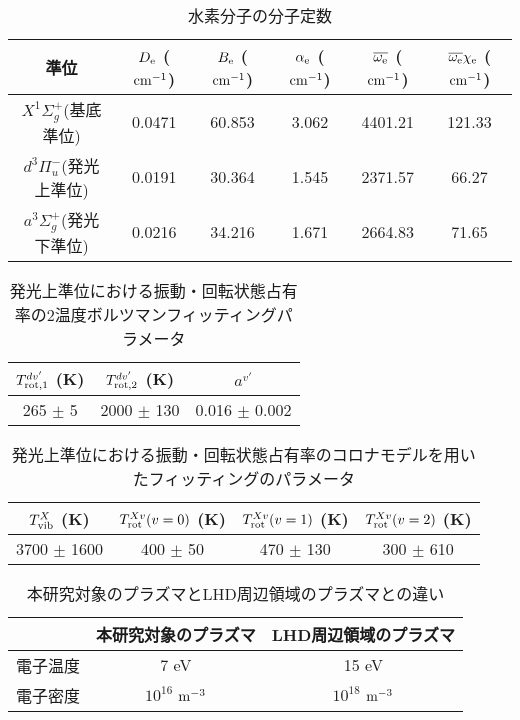 \listoftables
{}

\begin{table}
    \caption{水素分子の分子定数\cite{nist}}
    \label{table:molecular-constants}
    \centering
    \begin{tabular}{cccccc}
        \hline
        準位 & $D_{\rm e}$ ($\rm cm^{-1}$)& $B_{\rm e}$ ($\rm cm^{-1}$)& $\alpha_{\rm e}$ ($\rm cm^{-1}$)& $\overline{\omega_{\rm e}}$ ($\rm cm^{-1}$)& $\overline{\omega_{\rm e}} \chi_{\rm e}$ ($\rm cm^{-1}$)\\
        \hline
        $X^1 \Sigma^+_g$(基底準位) & 0.0471 & 60.853 & 3.062 & 4401.21 & 121.33\\
        $d^3 \Pi^-_u$(発光上準位) & 0.0191 & 30.364 & 1.545 & 2371.57 & 66.27\\
        $a^3 \Sigma^+_g$(発光下準位) & 0.0216 & 34.216 & 1.671 & 2664.83 & 71.65\\
        \hline
    \end{tabular}
\end{table}

\begin{table}
    \caption{発光上準位における振動・回転状態占有率の2温度ボルツマンフィッティングパラメータ}
    \label{table:two-boltzmann-parameters}
    \centering
    \begin{tabular}{ccc}
        \hline
        $T^{dv'}_{\rm rot,1}$ (K) & $T^{dv'}_{\rm rot,2}$ (K) & $a^{v'}$ \\
        \hline
        265 $\pm$ 5 & 2000 $\pm$ 130 & 0.016 $\pm$ 0.002\\
        \hline
    \end{tabular}
\end{table}

\begin{table}
    \caption{発光上準位における振動・回転状態占有率のコロナモデルを用いたフィッティングのパラメータ}
    \label{table:fitting-result}
    \centering
    \begin{tabular}{cccc}
        \hline
        $T^{X}_{\rm vib}$ (K) & $T^{Xv}_{\rm rot}(v=0)$ (K) & $T^{Xv}_{\rm rot}(v=1)$ (K) & $T^{Xv}_{\rm rot}(v=2)$ (K)\\
        \hline
        3700 $\pm$ 1600 & 400 $\pm$ 50 & 470 $\pm$ 130 & 300 $\pm$ 610\\
        \hline
    \end{tabular}
\end{table}

\begin{table}
    \caption{本研究対象のプラズマとLHD周辺領域のプラズマ\cite{ishihara}との違い}
    \label{table:LHD-and-this-plasma}
    \centering
    \begin{tabular}{ccc}
        \hline
         & 本研究対象のプラズマ & LHD周辺領域のプラズマ\\
        \hline
        電子温度 & 7 eV & 15 eV\\
        電子密度 & $10^{16}$ $\rm m^{-3}$ & $10^{18}$ $\rm m^{-3}$\\
        \hline
    \end{tabular}
\end{table}

